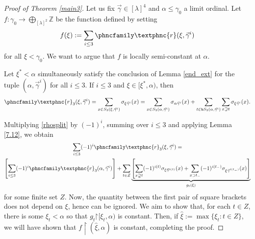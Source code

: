 \documentclass{amsart}
\numberwithin{theorem}{section}
\theoremstyle{definition}
\newcommand{\restr}{\mathord{\upharpoonright}}
\newcommand{\Z}{\mathbb{Z}}
\newcommand{\bS}{\mathtt{b}S}
\newcommand{\resh}{{\phncfamily\textphnc{r}}}
\begin{document}
\begin{proof}[Proof of Theorem \ref{main3}]

Let us fix $\vec\gamma\in [\lambda]^4$ and $\alpha\leq\gamma_0$ a limit ordinal. Let $f:\gamma_0\to\bigoplus_{[\lambda]^2}\Z$ be the function defined by setting
\begin{equation}\label{f}
f(\xi):=\sum_{i\le 3}\resh(\xi,\vec\gamma^i)
\end{equation}
for all $\xi < \gamma_0$. We want to argue that $f$ is locally semi-constant at $\alpha$.

Let $\xi^*<\alpha$ simultaneously satisfy the conclusion of Lemma \ref{end_ext} for the tuple 
$(\alpha,\vec{\gamma}^i)$ for all $i \leq 3$. If $i\le 3$ and $\xi\in [\xi^*,\alpha)$, then
\begin{equation}\label{rhosplit}
\resh_3(\xi,\vec\gamma^i)=\sum_{x\in S_3(\xi,\vec\gamma^i)}\sigma_{\xi\vec\gamma^i}(x)=\sum_{x\in S_3(\alpha,\vec\gamma^i)}\sigma_{\alpha\vec\gamma^i}(x)+\sum_{t\in \bS_3(\alpha,\vec\gamma^i)}\sum_{x\supsetneq t}\sigma_{\xi\vec\gamma^i}(x).
\end{equation}

Multiplying \eqref{rhosplit} by $(-1)^i$, summing over $i\le 3$ and applying Lemma \ref{7.12}, we obtain
\begin{multline}\label{rhosum}
\sum_{i\le 3}(-1)^i\resh_3(\xi,\vec\gamma^i)= \\ \left[\sum_{i\le 3}(-1)^i\resh_3(\alpha,\vec\gamma^i)\right]+\sum_{t\in Z}\underbrace{\left[\sum_{x\supsetneq t}(-1)^{i(t)}\sigma_{\xi\vec\gamma^{i(t)}}(x)+\sum_{x\supset t_-}(-1)^{i(t_-)}\sigma_{\xi\vec\gamma^{i(t_-)}}(x)\right]}_{g_t(\xi)}
\end{multline}
for some finite set $Z$. Now, the quantity between the first pair of square brackets does not depend on $\xi$, hence can be ignored. We aim to show that, for each $t\in Z$, there is some $\xi_t<\alpha$ so that $g_t\restr [\xi_t,\alpha)$ is constant. Then, if $\hat{\xi}:=\max\{\xi_t:t\in Z\}$, we will have 
shown that $f \restriction (\hat{\xi},\alpha)$ is constant, completing the proof.


\end{proof}
\end{document}
